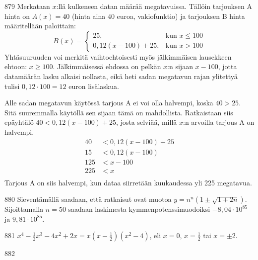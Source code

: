 \begin{Vastaus}{879}
	Merkataan $x$:llä kulkeneen datan määrää megatavuissa. Tällöin tarjouksen A hinta on $A(x)=40$ (hinta aina $40$ euroa, vakiofunktio) ja tarjouksen B hinta määritellään paloittain:
	$$B(x)=\begin{cases}
	25, & \mbox{kun } x\leq 100 \\
	0,12(x-100)+25, & \mbox{kun } x>100
	\end{cases}$$
Yhtäsuuruuden voi merkitä vaihtoehtoisesti myös jälkimmäisen lausekkeen ehtoon: $x\geq 100$. Jälkimmäisessä ehdossa on pelkän $x$:n sijaan $x-100$, jotta datamäärän lasku alkaisi nollasta, eikä heti sadan megatavun rajan ylitettyä tulisi $0,12\cdot 100=12$ euron lisälaskua.

Alle sadan megatavun käytössä tarjous A ei voi olla halvempi, koska $40>25$. Sitä suuremmalla käytöllä sen sijaan tämä on mahdollista. Ratkaistaan siis epäyhtälö $40<0,12(x-100)+25$, josta selviää, millä $x$:n arvoilla tarjous A on halvempi.
\begin{align*}
40&<0,12(x-100)+25 \\
15 &<0,12(x-100) \\
125&<x-100 \\
225&<x \\
\end{align*}
	Tarjous A on siis halvempi, kun dataa siirretään kuukaudessa yli 225 megatavua.
	
\end{Vastaus}
\begin{Vastaus}{880}
	Sieventämällä saadaan, että ratkaisut ovat muotoa $y=n^n (1\pm \sqrt{1+2n})$. Sijoittamalla $n=50$ saadaan laskimesta kymmenpotenssimuodoiksi $-8,04\cdot 10^{85}$ ja $9,81\cdot 10^{85}$.
	
\end{Vastaus}
\begin{Vastaus}{881}
$x^4-\frac{1}{2}x^3-4x^2+2x=x(x-\frac{1}{2})(x^2-4)$, eli $x=0$, $x=\frac{1}{2}$ tai $x=\pm 2$.
	
\end{Vastaus}
\begin{Vastaus}{882}
		
\end{Vastaus}

